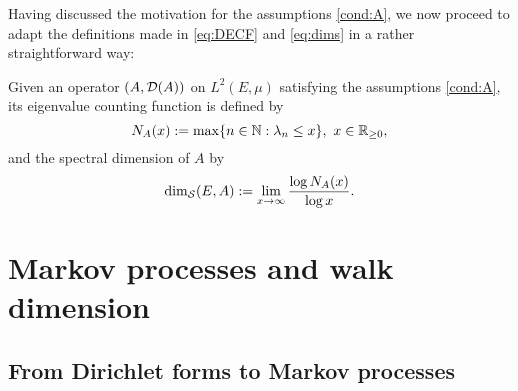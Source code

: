 Having discussed the motivation for the assumptions \ref{cond:A}, we now proceed to adapt the definitions made in \eqref{eq:DECF} and \eqref{eq:dims} in a rather straightforward way:
\begin{defin}
  Given an operator $(A,\mathcal{D}(A))$ on $L^2(E,\mu)$ satisfying the assumptions \ref{cond:A}, its eigenvalue counting function is defined by
  \begin{equation}\label{eq:defEVCF}
    N_A(x):=\max\{n\in\mathbb{N}:\lambda_n\leq x\},\ x\in\mathbb{R}_{\geq0},
  \end{equation}
  and the spectral dimension of $A$ by
  \begin{equation}\label{eq:defdims}
    \dim_{\mathcal{S}}(E,A):=\lim_{x\to\infty}\frac{\log N_A(x)}{\log x}.
  \end{equation}
\end{defin}




\section{Markov processes and walk dimension}

\subsection{From Dirichlet forms to Markov processes}

